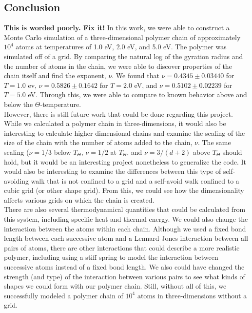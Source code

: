 \documentclass{article}
\begin{document}
\begin{multicols}{2}
\section{Conclusion}
\label{concl}

\textbf{This is worded poorly.  Fix it!}  In this work, we were able to construct a Monte Carlo simulation of a three-dimensional polymer chain of approximately $10^4$ atoms at temperatures of 1.0 eV, 2.0 eV, and 5.0 eV.  The polymer was simulated off of a grid.  By comparing the natural log of the gyration radius and the number of atoms in the chain, we were able to discover properties of the chain itself and find the exponent, $\nu$.  We found that $\nu = 0.4345 \pm 0.03440$ for $T = 1.0 $ ev, $\nu = 0.5826 \pm 0.1642$ for $T =2.0$ eV, and $\nu = 0.5102 \pm 0.02239$ for $T=5.0$ eV.  Through this, we were able to compare to known behavior above and below the $\Theta$-temperature.  \\

However, there is still future work that could be done regarding this project.  While we calculated a polymer chain in three-dimensions, it would also be interesting to calculate higher dimensional chains and examine the scaling of the size of the chain with the number of atoms added to the chain, $\nu$.  The same scaling ($\nu = 1/3$ below $T_\Theta$, $\nu = 1/2$ at $T_\Theta$, and $\nu = 3/(d+2)$ above $T_\Theta$ should hold, but it would be an interesting project nonetheless to generalize the code.  It would also be interesting to examine the differences between this type of self-avoiding walk that is not confined to a grid and a self-avoid walk confined to a cubic grid (or other shape grid).  From this, we could see how the dimensionality affects various grids on which the chain is created.  \\

There are also several thermodynamical quantities that could be calculated from this system, including specific heat and thermal energy.  We could also change the interaction between the atoms within each chain.  Although we used a fixed bond length between each successive atom and a Lennard-Jones interaction between all pairs of atoms, there are other interactions that could describe a more realistic polymer, including using a stiff spring to model the interaction between successive atoms instead of a fixed bond length.  We also could have changed the strength (and type) of the interaction between various pairs to see what kinds of shapes we could form with our polymer chain.  Still, without all of this, we successfully modeled a polymer chain of $10^4$ atoms in three-dimensions without a grid.  \\


\end{multicols}
\end{document}
